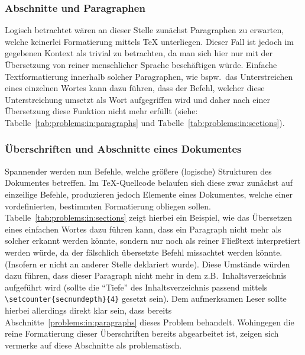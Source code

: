 \subsubsection*{Abschnitte und Paragraphen}\label{problems:in:paragraphs}
Logisch betrachtet wären an dieser Stelle zunächst Paragraphen zu erwarten, welche keinerlei Formatierung mittels \TeX{} unterliegen. Dieser Fall ist jedoch im gegebenen Kontext als trivial zu betrachten, da man sich hier nur mit der Übersetzung von reiner menschlicher Sprache beschäftigen würde. Einfache Textformatierung innerhalb solcher Paragraphen, wie bspw.\ das Unterstreichen eines einzelnen Wortes kann dazu führen, dass der Befehl, welcher diese Unterstreichung umsetzt als Wort aufgegriffen wird und daher nach einer Übersetzung diese Funktion nicht mehr erfüllt (siehe: Tabelle~\ref{tab:problems:in:paragraphs} und Tabelle~\ref{tab:problems:in:sections}).
\subsubsection*{Überschriften und Abschnitte eines Dokumentes}
Spannender werden nun Befehle, welche größere (logische) Strukturen des Dokumentes betreffen. Im \TeX{}-Quellcode belaufen sich diese zwar zunächst auf einzeilige Befehle, produzieren jedoch Elemente eines Dokumentes, welche einer vordefinierten, bestimmten Formatierung obliegen sollen. Tabelle~\ref{tab:problems:in:sections} zeigt hierbei ein Beispiel, wie das Übersetzen eines einfachen Wortes dazu führen kann, dass ein Paragraph nicht mehr als solcher erkannt werden könnte, sondern nur noch als reiner Fließtext interpretiert werden würde, da der fälschlich übersetzte Befehl missachtet werden könnte. (Insofern er nicht an anderer Stelle deklariert wurde). Diese Umstände würden dazu führen, dass dieser Paragraph nicht mehr in dem z.B.\ Inhaltsverzeichnis aufgeführt wird (sollte die \enquote{Tiefe} des Inhaltsverzeichnis passend mittels \verb|\setcounter{secnumdepth}{4}|%
gesetzt sein).
Dem aufmerksamen Leser sollte hierbei allerdings direkt klar sein, dass bereits Abschnitte~\ref{problems:in:paragraphs} dieses Problem behandelt. Wohingegen die reine Formatierung dieser Überschriften bereits abgearbeitet ist, zeigen sich vermerke auf diese Abschnitte als problematisch. 

